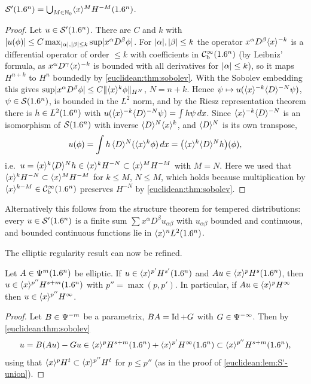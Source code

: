 \begin{lemma}\label{euclidean:lem:S'-union}
  $\mathcal{S}'(1.6^n)=\bigcup_{M\in\mathbb{N}_0}\langle x\rangle^MH^{-M}(1.6^n)$.
\end{lemma}
\begin{proof}
  Let $u\in\mathcal{S}'(1.6^n)$. There are $C$ and $k$ with
  $\lvert u(\phi)\rvert\le C\max_{\lvert \alpha\rvert,\lvert \beta\rvert\le k}\sup\lvert x^\alpha D^\beta\phi\rvert$.
  For $\lvert \alpha\rvert,\lvert \beta\rvert\le k$ the operator
  $x^\alpha D^\beta\langle x\rangle^{-k}$ is a differential operator of order $\le k$
  with coefficients in $\mathcal{C}^\infty_{\mathrm{b}}(1.6^n)$ (by Leibniz' formula, as
  $x^\alpha D^\gamma\langle x\rangle^{-k}$ is bounded with all derivatives for
  $\lvert \alpha\rvert\le k$), so it maps $H^{n+k}$ to $H^n$ boundedly by
  \cref{euclidean:thm:sobolev}. With the Sobolev embedding this gives
  $\sup\lvert x^\alpha D^\beta\phi\rvert\le C\lVert \langle x\rangle^k\phi\rVert_{H^{N}}$, $N=n+k$. Hence
  $\psi\mapsto u(\langle x\rangle^{-k}\langle D\rangle^{-N}\psi)$, $\psi\in\mathcal{S}(1.6^n)$, is bounded in
  the $L^2$ norm, and by the Riesz representation theorem there is
  $h\in L^2(1.6^n)$ with $u(\langle x\rangle^{-k}\langle D\rangle^{-N}\psi)=\int h\psi\,dx$. Since
  $\langle x\rangle^{-k}\langle D\rangle^{-N}$ is an isomorphism of $\mathcal{S}(1.6^n)$ with inverse
  $\langle D\rangle^N\langle x\rangle^k$, and $\langle D\rangle^N$ is its own transpose,
  \begin{equation*}
    u(\phi)=\int h\,\langle D\rangle^N(\langle x\rangle^k\phi)\,dx=\bigl(\langle x\rangle^k\langle D\rangle^Nh\bigr)(\phi),
  \end{equation*}
  i.e.\ $u=\langle x\rangle^k\langle D\rangle^Nh\in\langle x\rangle^kH^{-N}\subset\langle x\rangle^MH^{-M}$ with
  $M=N$. Here we used that $\langle x\rangle^kH^{-N}\subset\langle x\rangle^{M}H^{-M}$ for $k\le M$,
  $N\le M$, which holds because multiplication by
  $\langle x\rangle^{k-M}\in\mathcal{C}^\infty_{\mathrm{b}}(1.6^n)$ preserves $H^{-N}$ by \cref{euclidean:thm:sobolev}.
\end{proof}

Alternatively this follows from the structure theorem for tempered
distributions: every $u\in\mathcal{S}'(1.6^n)$ is a finite sum
$\sum x^\alpha D^\beta u_{\alpha\beta}$ with $u_{\alpha\beta}$ bounded and
continuous, and bounded continuous functions lie in $\langle x\rangle^{n}L^2(1.6^n)$.

The elliptic regularity result can now be refined.

\begin{proposition}\label{euclidean:prop:elliptic-sobolev}
  Let $A\in\Psi^{m}(1.6^n)$ be elliptic. If $u\in\langle x\rangle^{p'}H^{s'}(1.6^n)$ and
  $Au\in\langle x\rangle^pH^s(1.6^n)$, then $u\in\langle x\rangle^{p''}H^{s+m}(1.6^n)$ with
  $p''=\max(p,p')$. In particular, if $Au\in\langle x\rangle^{p}H^\infty$ then $u\in\langle x\rangle^{p''}H^\infty$.
\end{proposition}
\begin{proof}
  Let $B\in\Psi^{-m}$ be a parametrix, $BA=\operatorname{Id}+G$ with $G\in\Psi^{-\infty}$.
  Then by \cref{euclidean:thm:sobolev}
  \begin{equation*}
    u=B(Au)-Gu\in\langle x\rangle^pH^{s+m}(1.6^n)+\langle x\rangle^{p'}H^{\infty}(1.6^n)
    \subset\langle x\rangle^{p''}H^{s+m}(1.6^n),
  \end{equation*}
  using that $\langle x\rangle^{p}H^t\subset\langle x\rangle^{p''}H^t$ for $p\le p''$ (as in the
  proof of \cref{euclidean:lem:S'-union}).
\end{proof}

